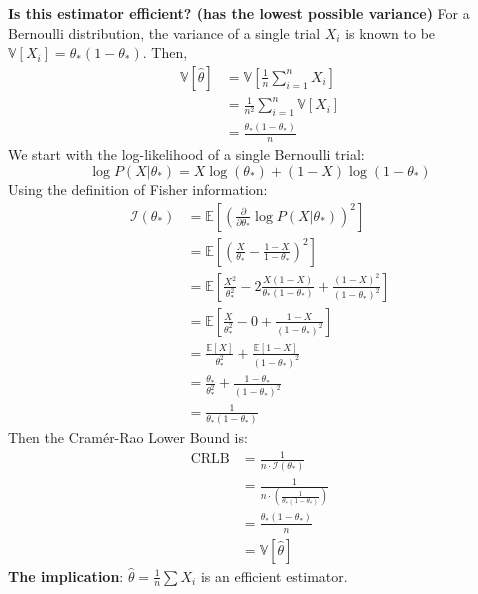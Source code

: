 \documentclass[../Probability.tex]{subfiles}
\begin{document}
\smallskip
\noindent \textbf{Is this estimator efficient? (has the lowest possible variance)}\newline
For a Bernoulli distribution, the variance of a single trial $X_i$ is known to be $\mathbb{V}[X_i] = \theta_*(1-\theta_*)$.
Then,
\begin{align*}
    \mathbb{V}[\hat{\theta}] &= \mathbb{V}\left[\frac{1}{n}\sum_{i=1}^n X_i\right] \\
    &= \frac{1}{n^2} \sum_{i=1}^n \mathbb{V}[X_i] \\
    &= \frac{\theta_*(1-\theta_*)}{n}
\end{align*}
We start with the log-likelihood of a single Bernoulli trial:
$$\log P(X|\theta_*) = X\log(\theta_*) + (1-X)\log(1-\theta_*)$$
Using the definition of Fisher information:
\begin{align*}
    \mathcal{I}(\theta_*) &= \mathbb{E}\left[\left(\frac{\partial}{\partial \theta_*} \log P(X|\theta_*)\right)^2\right] \\
    &= \mathbb{E}\left[\left(\frac{X}{\theta_*} - \frac{1-X}{1-\theta_*}\right)^2\right] \\
    &= \mathbb{E}\left[\frac{X^2}{\theta_*^2} - 2\frac{X(1-X)}{\theta_*(1-\theta_*)} + \frac{(1-X)^2}{(1-\theta_*)^2}\right] \\
    &= \mathbb{E}\left[ \frac{X}{\theta_*^2} - 0 + \frac{1-X}{(1-\theta_*)^2} \right] \\
    &= \frac{\mathbb{E}[X]}{\theta_*^2} + \frac{\mathbb{E}[1-X]}{(1-\theta_*)^2} \\
    &= \frac{\theta_*}{\theta_*^2} + \frac{1-\theta_*}{(1-\theta_*)^2} \\
    &= \frac{1}{\theta_*(1-\theta_*)}
\end{align*}
Then the Cramér-Rao Lower Bound is:
\begin{align*}
    \text{CRLB} &= \frac{1}{n \cdot \mathcal{I}(\theta_*)} \\
    &= \frac{1}{n \cdot \left(\frac{1}{\theta_*(1-\theta_*)}\right)} \\
    &= \frac{\theta_*(1-\theta_*)}{n} \\
    &= \mathbb{V}[\hat{\theta}]
\end{align*}
\textbf{The implication}:  $\hat{\theta} = \frac{1}{n}\sum X_i$ is an efficient estimator.
\end{document}
